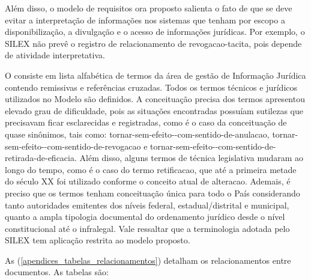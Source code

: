 \documentclass[a4paper,11pt,openright,twoside,brazil]{abntex2}
\begin{document}
Além disso, o modelo de requisitos ora proposto salienta o fato de que se deve
evitar a interpretação de informações nos sistemas que tenham por escopo a
disponibilização, a divulgação e o acesso de informações jurídicas. Por exemplo,
o SILEX não prevê o registro de relacionamento de \gls{revogacao-tacita}, pois
depende de atividade interpretativa.

O \hyperref[cap_glossario]{\glossaryname} consiste em lista alfabética de termos
da área de gestão de Informação Jurídica contendo remissivas e referências
cruzadas. Todos os termos técnicos e jurídicos utilizados no Modelo são
definidos. A conceituação precisa dos termos apresentou elevado grau de
dificuldade, pois as situações encontradas possuíam sutilezas que precisavam
ficar esclarecidas e registradas, como é o caso da conceituação de quase
sinônimos, tais como: \gls{tornar-sem-efeito--com-sentido-de-anulacao},
\gls{tornar-sem-efeito--com-sentido-de-revogacao} e
\gls{tornar-sem-efeito--com-sentido-de-retirada-de-eficacia}. Além disso, alguns
termos de técnica legislativa mudaram ao longo do tempo, como é o caso do termo
\gls{retificacao}, que até a primeira metade do século XX foi utilizado conforme
o conceito atual de \gls{alteracao}. Ademais, é preciso que os termos tenham
conceituação única para todo o País considerando tanto autoridades emitentes dos
níveis federal, estadual/distrital e municipal, quanto a ampla tipologia
documental do ordenamento jurídico desde o nível constitucional até o
infralegal. Vale ressaltar que a terminologia adotada pelo SILEX tem aplicação
restrita ao modelo proposto.

As 
(\autoref{apendices_tabelas_relacionamentos}) detalham os relacionamentos entre
documentos. As tabelas são: 
\end{document}
